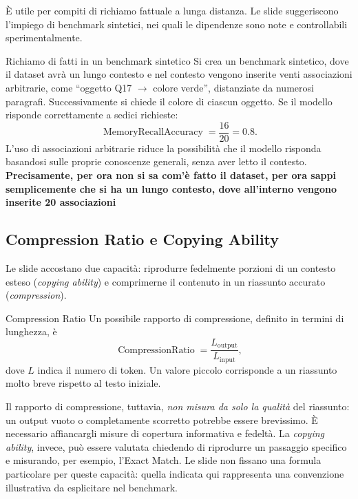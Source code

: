 È utile per compiti di richiamo fattuale a lunga distanza. Le slide suggeriscono l'impiego di benchmark sintetici, nei quali le dipendenze sono note e controllabili sperimentalmente.

\begin{example}{Richiamo di fatti in un benchmark sintetico}
Si crea un benchmark sintetico, dove il dataset avrà un lungo contesto e nel contesto vengono inserite venti associazioni arbitrarie, come ``oggetto Q17 $\rightarrow$ colore verde'', distanziate da numerosi paragrafi. Successivamente si chiede il colore di ciascun oggetto. Se il modello risponde correttamente a sedici richieste:
\begin{equation}
\operatorname{MemoryRecallAccuracy}=\frac{16}{20}=0.8.
\end{equation}
L'uso di associazioni arbitrarie riduce la possibilità che il modello risponda basandosi sulle proprie conoscenze generali, senza aver letto il contesto.
\textbf{Precisamente, per ora non si sa com'è fatto il dataset, per ora sappi semplicemente che si ha un lungo contesto, dove all'interno vengono inserite 20 associazioni}
\end{example}

\newpage

\subsection{Compression Ratio e Copying Ability}

Le slide accostano due capacità: riprodurre fedelmente porzioni di un contesto esteso (\emph{copying ability}) e comprimerne il contenuto in un riassunto accurato (\emph{compression}).

\begin{definition}{Compression Ratio}
Un possibile rapporto di compressione, definito in termini di lunghezza, è
\begin{equation}
\operatorname{CompressionRatio}=\frac{L_{\mathrm{output}}}{L_{\mathrm{input}}},
\end{equation}
dove $L$ indica il numero di token. Un valore piccolo corrisponde a un riassunto molto breve rispetto al testo iniziale.
\end{definition}

Il rapporto di compressione, tuttavia, \emph{non misura da solo la qualità} del riassunto: un output vuoto o completamente scorretto potrebbe essere brevissimo. È necessario affiancargli misure di copertura informativa e fedeltà. La \emph{copying ability}, invece, può essere valutata chiedendo di riprodurre un passaggio specifico e misurando, per esempio, l'Exact Match. Le slide non fissano una formula particolare per queste capacità: quella indicata qui rappresenta una convenzione illustrativa da esplicitare nel benchmark.

